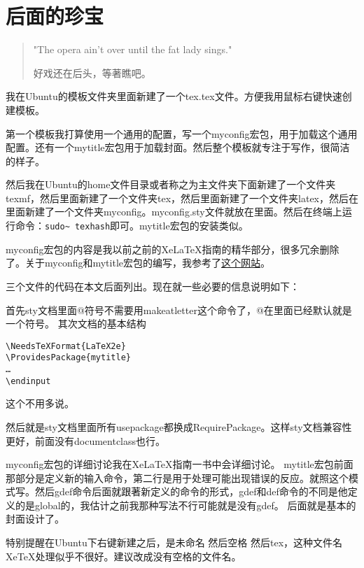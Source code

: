 \part{后面的珍宝}
\begin{quotation}
"The opera ain't over until the fat lady sings."

好戏还在后头，等著瞧吧。
\end{quotation}

我在Ubuntu的模板文件夹里面新建了一个tex.tex文件。方便我用鼠标右键快速创建模板。

第一个模板我打算使用一个通用的配置，写一个myconfig宏包，用于加载这个通用配置。还有一个mytitle宏包用于加载封面。然后整个模板就专注于写作，很简洁的样子。

然后我在Ubuntu的home文件目录或者称之为主文件夹下面新建了一个文件夹texmf，然后里面新建了一个文件夹tex，然后里面新建了一个文件夹latex，然后在里面新建了一个文件夹myconfig。myconfig.sty文件就放在里面。然后在终端上运行命令：\verb+sudo~ texhash+即可。mytitle宏包的安装类似。

myconfig宏包的内容是我以前之前的XeLaTeX指南的精华部分，很多冗余删除了。关于myconfig和mytitle宏包的编写，我参考了\href{http://tex.stackexchange.com/questions/70166/create-a-function-that-generates-a-title-page}{这个网站}。

三个文件的代码在本文后面列出。现在就一些必要的信息说明如下：

首先sty文档里面@符号不需要用makeatletter这个命令了，@在里面已经默认就是一个符号。
其次文档的基本结构
\begin{verbatim}
\NeedsTeXFormat{LaTeX2e}
\ProvidesPackage{mytitle}
…
\endinput
\end{verbatim}
这个不用多说。

然后就是sty文档里面所有usepackage都换成RequirePackage。这样sty文档兼容性更好，前面没有documentclass也行。

myconfig宏包的详细讨论我在XeLaTeX指南一书中会详细讨论。
mytitle宏包前面那部分是定义新的输入命令，第二行是用于处理可能出现错误的反应。就照这个模式写。然后gdef命令后面就跟著新定义的命令的形式，gdef和def命令的不同是他定义的是global的，我估计之前我那种写法不行可能就是没有gdef。
后面就是基本的封面设计了。

特别提醒在Ubuntu下右键新建之后，是未命名 然后空格 然后tex，这种文件名XeTeX处理似乎不很好。建议改成没有空格的文件名。

